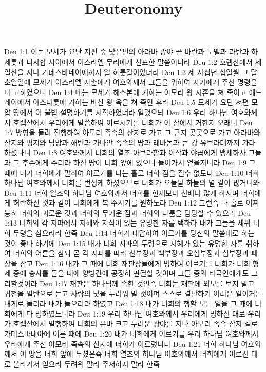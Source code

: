 

\title{Deuteronomy}

Deu 1:1  이는 모세가 요단 저편 숲 맞은편의 아라바 광야 곧 바란과 도벨과 라반과 하세롯과 디사합 사이에서 이스라엘 무리에게 선포한 말씀이니라
Deu 1:2  호렙산에서 세일산을 지나 가데스바네아에까지 열 하룻길이었더라
Deu 1:3  제 사십년 십일월 그 달 초일일에 모세가 이스라엘 자손에게 여호와께서 그들을 위하여 자기에게 주신 명령을 다 고하였으니
Deu 1:4  때는 모세가 헤스본에 거하는 아모리 왕 시혼을 쳐 죽이고 에드레이에서 아스다롯에 거하는 바산 왕 옥을 쳐 죽인 후라
Deu 1:5  모세가 요단 저편 모압 땅에서 이 율법 설명하기를 시작하였더라 일렸으되
Deu 1:6  우리 하나님 여호와께서 호렙산에서 우리에게 말씀하여 이르시기를 너희가 이 산에서 거한지 오래니
Deu 1:7  방향을 돌려 진행하여 아모리 족속의 산지로 가고 그 근지 곳곳으로 가고 아라바와 산지와 평지와 남방과 해변과 가나안 족속의 땅과 레바논과 큰 강 유브라데까지 가라 하셨나니
Deu 1:8  여호와께서 너희의 열조 아브라함과 이삭과 야곱에게 맹세하사 그들과 그 후손에게 주리라 하신 땅이 너희 앞에 있으니 들어가서 얻을지니라
Deu 1:9  그 때에 내가 너희에게 말하여 이르기를 나는 홀로 너희 짐을 질수 없도다
Deu 1:10  너희 하나님 여호와께서 너희를 번성케 하셨으므로 너희가 오늘날 하늘의 별 같이 많거니와
Deu 1:11  너희 열조의 하나님 여호와께서 너희를 현재보다 천배나 많게 하시며 너희에게 허락하신 것과 같이 너희에게 복 주시기를 원하노라
Deu 1:12  그런즉 나 홀로 어찌 능히 너희의 괴로운 것과 너희의 무거운 짐과 너희의 다툼을 담당할 수 있으랴
Deu 1:13  너희의 각 지파에서 지혜와 지식이 있는 유명한 자를 택하라 내가 그들을 세워 너희 두령을 삼으리라 한즉
Deu 1:14  너희가 대답하여 이르기를 당신의 말씀대로 하는 것이 좋다 하기에
Deu 1:15  내가 너희 지파의 두령으로 지혜가 있는 유명한 자를 취하여 너희의 어른을 삼되 곧 각 지파를 따라 천부장과 백부장과 오십부장과 십부장과 패장을 삼고
Deu 1:16  내가 그 때에 너희 재판장들에게 명하여 이르기를 너희가 너희 형제 중에 송사를 들을 때에 양방간에 공정히 판결할 것이며 그들 중의 타국인에게도 그리할것이라
Deu 1:17  재판은 하나님께 속한 것인즉 너희는 재판에 외모를 보지 말고 귀천을 일반으로 듣고 사람의 낯을 두려워 말 것이며 스스로 결단하기 어려운 일이거든 내게로 돌리라 내가 들으리라 하였고
Deu 1:18  내가 너희의 행할 모든 일을 그 때에 너희에게 다 명하였느니라
Deu 1:19  우리 하나님 여호와께서 우리에게 명하신 대로 우리가 호렙산에서 발행하여 너희의 본바 크고 두려운 광야를 지나 아모리 족속 산지 길로 가데스바네아에 이른 때에
Deu 1:20  내가 너희에게 이르기를 우리 하나님 여호와께서 우리에게 주신 아모리 족속의 산지에 너희가 이르렀나니
Deu 1:21  너희 하나님 여호와께서 이 땅을 너희 앞에 두셨은즉 너희 열조의 하나님 여호와께서 너희에게 이르신 대로 올라가서 얻으라 두려워 말라 주저하지 말라 한즉
